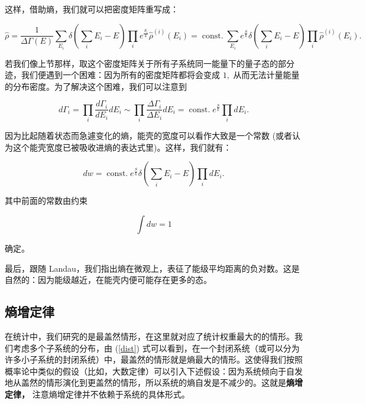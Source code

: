 这样，借助熵，我们就可以把密度矩阵重写成：
\begin{linenomath}\begin{equation}
\hat\rho = \frac{1}{\Delta\Gamma\left( E \right)}\sum_{E_i} \delta(\sum_{i} E_i - E)\prod_i e^{\frac{S_i}{k}} {\hat\rho}^{\left( i \right)}\left( E_i \right)=\operatorname{const.} \sum_{E_i} e^{\frac Sk} \delta(\sum_{i} E_i - E)\prod_i {\hat\rho}^{\left( i \right)}\left( E_i \right).
\end{equation}\end{linenomath}

若我们像上节那样，取这个密度矩阵关于所有子系统同一能量下的量子态的部分迹，我们便遇到一个困难：因为所有的密度矩阵都将会变成 $1,$ 从而无法计量能量的分布密度。为了解决这个困难，我们可以注意到
\begin{linenomath}\begin{equation}
d\Gamma_i=\prod_i\frac{d \Gamma_i}{d E_i}dE_i \sim \prod_i\frac{\Delta \Gamma_i}{\Delta E_i}d E_i = \operatorname{const.} e^{\frac Sk} \prod_i d E_i.
\end{equation}\end{linenomath}
因为比起随着状态而急遽变化的熵，能壳的宽度可以看作大致是一个常数 (或者认为这个能壳宽度已被吸收进熵的表达式里)。这样，我们就有：
\begin{linenomath}\begin{equation}
dw = \operatorname{const.} e^{\frac Sk} \delta(\sum_{i} E_i - E) \prod_i d E_i.
\label{dist}
\end{equation}\end{linenomath}
其中前面的常数由约束 \begin{linenomath}\begin{equation}\int dw = 1\end{equation}\end{linenomath} 确定。

最后，跟随 Landau，我们指出熵在微观上，表征了能级平均距离的负对数。这是自然的：因为能级越近，在能壳内便可能存在更多的态。
\subsection{熵增定律}
在统计中，我们研究的是最盖然情形，在这里就对应了统计权重最大的的情形。我们考虑多个子系统的分布，由 (\ref{dist}) 式可以看到，在一个封闭系统（或可以分为许多小子系统的封闭系统）中，最盖然的情形就是熵最大的情形。这使得我们按照概率论中类似的假设（比如，大数定律）可以引入下述假设：因为系统倾向于自发地从盖然的情形演化到更盖然的情形，所以系统的熵自发是不减少的。这就是\textbf{熵增定律，} 注意熵增定律并不依赖于系统的具体形式。

